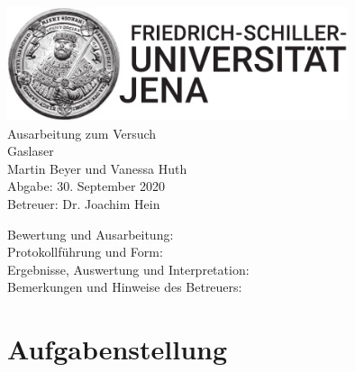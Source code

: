 \documentclass[a4paper,twoside,final]{article}
\begin{document}
\setlength{\marginparsep}{2em}
\renewcommand{\theequation}{\arabic{section}.\arabic{equation}}
\renewcommand{\thefigure}{\arabic{section}.\arabic{figure}}
\renewcommand{\thetable}{\arabic{section}.\arabic{table}}

\begin{center}
\thispagestyle{empty}
  \includegraphics[width=0.75\textwidth]{../UniJena_BildWortMarke_black.pdf}\\[4em]
  \Large
  Ausarbeitung zum Versuch\\[2em]
  \Huge
  Gaslaser\\
  \vspace{2cm}
  \Large
  Martin Beyer und Vanessa Huth\\[2em]
  Abgabe: 30. September 2020\\[2em]
  Betreuer: Dr. Joachim Hein\\[5em]
  \begin{flushleft}
  	Bewertung und Ausarbeitung:\\[2em]
		Protokollführung und Form:\\[1em]
		Ergebnisse, Auswertung und Interpretation:\\[1em]
		Bemerkungen und Hinweise des Betreuers:
  \end{flushleft}
\end{center}
\clearpage

\pagestyle{fancy}
\renewcommand{\headrulewidth}{0pt}
\renewcommand{\footrulewidth}{0.5pt}
\renewcommand{\sectionmark}[1]{\markright{#1}}
\fancyhead[RE,LO]{\rightmark}
\fancyfoot[LE,RO]{\bfseries\thepage}
\renewcommand{\headrulewidth}{0.5pt}
\renewcommand{\footrulewidth}{0.5pt}

\setcounter{equation}{0}
\setcounter{figure}{0}
\tableofcontents
\newpage
\section{Aufgabenstellung} \label{sec:Aufgabenstellung}
\end{document}
